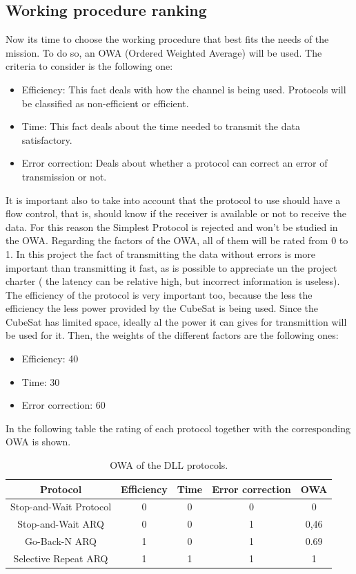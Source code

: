 \documentclass[12pt,a4paper]{report}
\begin{document}
\subsection{Working procedure ranking}
Now its time to choose the working procedure that best fits the needs of the mission. To do so, an OWA (Ordered Weighted Average) will be used. The criteria to consider is the following one:
\begin{itemize}
\item Efficiency: This fact deals with how the channel is being used. Protocols will be classified as non-efficient or efficient. 
\item Time: This fact deals about the time needed to transmit the data satisfactory.
\item Error correction: Deals about whether a protocol can correct an error of transmission or not.
\end{itemize}
It is important also to take into account that the protocol to use should have a flow control, that is, should know if the receiver is available or not to receive the data. For this reason the Simplest Protocol is rejected and won't be studied in the OWA. Regarding the factors of the OWA, all of them will be rated from 0 to 1. In this project the fact of transmitting the data without errors is more important than transmitting it fast, as is possible to appreciate un the project charter ( the latency can be relative high, but incorrect information is useless). The efficiency of the protocol is very important too, because the less the efficiency the less power provided by the CubeSat is being used. Since the CubeSat has limited space, ideally al the power it can gives for transmittion will be used for it. Then, the weights of the different factors are the following ones:
\begin{itemize}
\item Efficiency: 40
\item Time: 30
\item Error correction: 60
\end{itemize} 
In the following table the rating of each protocol together with the corresponding OWA is shown. 
\begin{table}[H]
\begin{center}
\begin{tabular}{ | c | c | c | c | c |}
\hline
Protocol&Efficiency&Time&Error correction&OWA\\
\hline
Stop-and-Wait Protocol&0&0&0&0\\
\hline
Stop-and-Wait ARQ&0&0&1&0,46\\
\hline
Go-Back-N ARQ&1&0&1&0.69\\
\hline
Selective Repeat ARQ&1&1&1&1\\
\hline
\end{tabular}
\caption{OWA of the DLL protocols.}
\end{center}
\end{table} 
\end{document}
